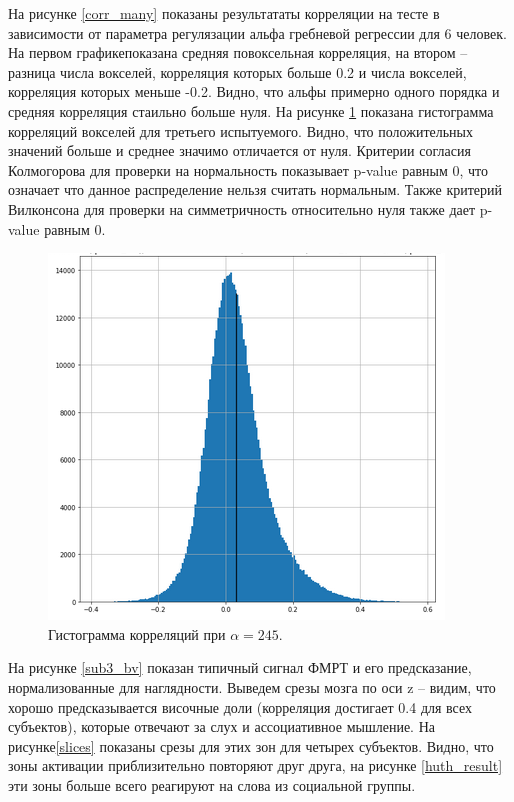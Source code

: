 \documentclass[pdftex,ptm,12pt,a4paper]{report}
\theoremstyle{definition}
\begin{document}
На рисунке \ref{corr_many} показаны результататы корреляции на тесте в зависимости от параметра регулязации альфа гребневой регрессии для 6 человек. На первом графикепоказана средняя повоксельная корреляция, на втором -- разница числа вокселей, корреляция которых больше 0.2 и числа вокселей, корреляция которых меньше -0.2.
Видно, что альфы примерно одного порядка и средняя корреляция стаильно больше нуля. На рисунке \ref{sub3_hist} показана гистограмма корреляций вокселей для третьего испытуемого. Видно, что положительных значений больше и среднее значимо отличается от нуля. Критерии согласия Колмогорова для проверки на нормальность показывает p-value равным 0, что означает что данное распределение нельзя считать нормальным. Также критерий Вилконсона для проверки на симметричность относительно нуля также дает p-value равным 0.

\begin{figure}[h]
\includegraphics[scale=0.6]{graphics/sub3_prep2.png}
\centering
\caption{Гистограмма корреляций при $\alpha=245$.}
\label{sub3_hist}
\end{figure}

На рисунке \ref{sub3_bv} показан типичный сигнал ФМРТ и его предсказание, нормализованные для наглядности. Выведем срезы мозга  по оси z -- видим, что хорошо предсказывается височные доли (корреляция достигает 0.4 для всех субъектов), которые отвечают за слух и ассоциативное мышление. На рисунке\ref{slices} показаны срезы для этих зон для четырех субъектов. Видно, что зоны активации приблизительно повторяют друг друга, на рисунке \ref{huth_result} эти зоны больше всего реагируют на слова из социальной группы. 
\end{document}
